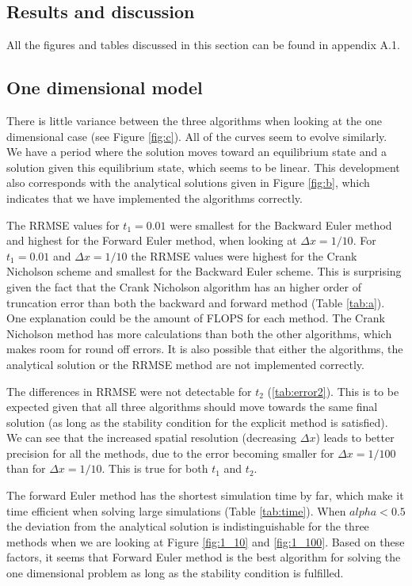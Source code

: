 \documentclass{article}
\begin{document}
\begin{multicols}{2}
\section{Results and discussion}

All the figures and tables discussed in this section can be found in appendix A.1.

\subsection{One dimensional model}
There is little variance between the three algorithms when looking at the one dimensional case (see Figure \ref{fig:c}). All of the curves seem to evolve similarly. We have a period where the solution moves toward an equilibrium state and a solution given this equilibrium state, which seems to be linear. This development also corresponds with the analytical solutions given in Figure \ref{fig:b}, which indicates that we have implemented the algorithms correctly. 

The RRMSE values for $t_1=0.01$ were smallest for the Backward Euler method and highest for the Forward Euler method, when looking at $\Delta x = 1/10$. For $t_1=0.01$ and $\Delta x = 1/10$ the RRMSE values were highest for the Crank Nicholson scheme and smallest for the Backward Euler scheme. This is surprising given the fact that the Crank Nicholson algorithm has an higher order of truncation error than both the backward and forward method (Table \ref{tab:a}). One explanation could be the amount of FLOPS for each method. The Crank Nicholson method has more calculations than both the other algorithms, which makes room for round off errors. It is also possible that either the algorithms, the analytical solution or the RRMSE method are not implemented correctly. 

The differences in RRMSE were not detectable for $t_2$ (\ref{tab:error2}). This is to be expected given that all three algorithms should move towards the same final solution (as long as the stability condition for the explicit method is satisfied). We can see that the increased spatial resolution (decreasing $\Delta x$) leads to better precision for all the methods, due to the error becoming smaller for $\Delta x=1/100$ than for $\Delta x = 1/10$. This is true for both $t_1$ and $t_2$. 

The forward Euler method has the shortest simulation time by far, which make it time efficient when solving large simulations (Table \ref{tab:time}). When $alpha<0.5$ the deviation from the analytical solution is indistinguishable for the three methods when we are looking at Figure \ref{fig:1_10} and \ref{fig:1_100}. Based on these factors, it seems that Forward Euler method is the best algorithm for solving the one dimensional problem as long as the stability condition is fulfilled. 


\end{multicols}
\end{document}

